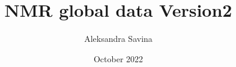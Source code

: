 \documentclass{book}
\begin{document}
\usepackage{enumitem}
\usepackage{epigraph}
\usepackage{lscape}
\usepackage{titletoc}
\usepackage{mdframed}

\usepackage{tabu}
\usepackage{pdfpages}

\usepackage{arydshln}
\usepackage{calc}
\usepackage[]{titlesec} 

\addto\captionsfrench{%
  \renewcommand{\listfigurename}{Liste des figures}%
}



\usepackage{sectsty}
\usepackage{lipsum}

\title{NMR global data Version2}
\author{Aleksandra Savina}
\date{October 2022}



\fancyhead{} %
\fancyfoot{} %
\fancyfoot[C]{--~\thepage~--}

\usepackage{emptypage}


\usepackage[acronym,xindy,toc]{glossaries} %
\makeglossaries
\end{document}
